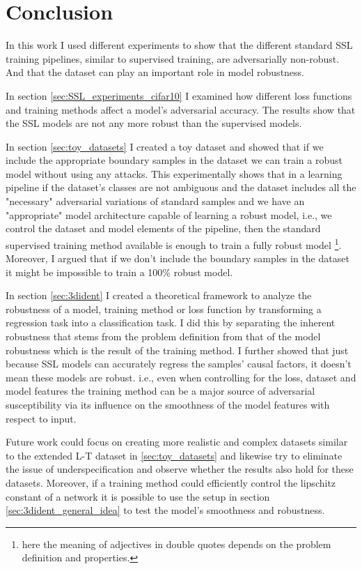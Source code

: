 \documentclass[../thesis.tex]{subfiles}
\begin{document}
\section{Conclusion}

	In this work I used different experiments to show that the different standard SSL training pipelines, similar to supervised training, are adversarially non-robust. And that the dataset can play an important role in model robustness.     

	In section \ref{sec:SSL_experiments_cifar10} I examined how different loss functions and training methods affect a model's adversarial accuracy. The results show that the SSL models are not any more robust than the supervised models. 
	
	In section \ref{sec:toy_datasets} I created a toy dataset and showed that if we include the appropriate boundary samples in the dataset we can train a robust model without using any attacks. This experimentally shows that in a learning pipeline if the dataset's classes are not ambiguous and the dataset includes all the "necessary" adversarial variations of standard samples and we have an "appropriate" model architecture capable of learning a robust model, i.e., we control the dataset and model elements of the pipeline, then the standard supervised training method available is enough to train a fully robust model \footnote{here the meaning of adjectives in double quotes depends on the problem definition and properties.}. Moreover, I argued that if we don't include the boundary samples in the dataset it might be impossible to train a 100\% robust model.
	
	In section \ref{sec:3dident} I created a theoretical framework to analyze  the robustness of a model, training method or loss function by transforming a regression task into a classification task. I did this by separating the inherent robustness that stems from the problem definition from that of the model robustness which is the result of the training method. I further showed that just because SSL models can accurately regress the samples' causal factors, it doesn't mean these models are robust. i.e., even when controlling for the loss, dataset and model features the training method can be a major source of adversarial susceptibility via its influence on the smoothness of the model features with respect to input.   
	
	Future work could focus on creating more realistic and complex datasets similar to the extended L-T dataset in \ref{sec:toy_datasets} and likewise try to eliminate the issue of underspecification and observe whether the results also hold for these datasets. Moreover, if a training method could efficiently control the lipschitz constant of a network it is possible to use the setup in section \ref{sec:3dident_general_idea} to test the model's smoothness and robustness. 
	       
\end{document}
